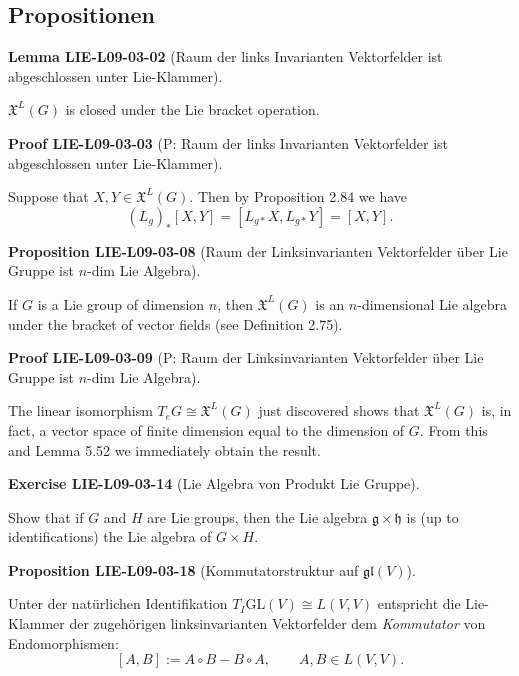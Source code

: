 \documentclass[10pt, letterpaper]{article}
\newcommand{\CustomHeading}[3]{%
  \par\medskip\noindent%
  \textbf{#1 #2} \textnormal{(#3)}.\enskip%
}
\newenvironment{PROP}[2]{\CustomHeading{Proposition}{#1}{#2}}{}
\newenvironment{LEM}[2]{\CustomHeading{Lemma}{#1}{#2}}{}
\newenvironment{EXE}[2]{\CustomHeading{Exercise}{#1}{#2}}{}
\newenvironment{PROOF}[2]{\CustomHeading{Proof}{#1}{#2}}{}
\begin{document}
\subsection{Propositionen}

\begin{LEM}{LIE-L09-03-02}{Raum der links Invarianten Vektorfelder ist abgeschlossen unter Lie-Klammer}
$\mathfrak{X}^{L}(G)$ is closed under the Lie bracket operation.
\end{LEM}

\begin{PROOF}{LIE-L09-03-03}{P: Raum der links Invarianten Vektorfelder ist abgeschlossen unter Lie-Klammer}
Suppose that $X, Y \in \mathfrak{X}^{L}(G)$. Then by Proposition 2.84 we have
$$
\left(L_{g}\right)_{*}[X, Y]=\left[L_{g *} X, L_{g *} Y\right]=[X, Y] .
$$
\end{PROOF}

\begin{PROP}{LIE-L09-03-08}{Raum der Linksinvarianten Vektorfelder über Lie Gruppe ist $n$-dim Lie Algebra}
If $G$ is a Lie group of dimension $n$, then $\mathfrak{X}^{L}(G)$ is an $n$-dimensional Lie algebra under the bracket of vector fields (see Definition 2.75).
\end{PROP}

\begin{PROOF}{LIE-L09-03-09}{P: Raum der Linksinvarianten Vektorfelder über Lie Gruppe ist $n$-dim Lie Algebra}
The linear isomorphism $T_{e} G \cong \mathfrak{X}^{L}(G)$ just discovered shows that $\mathfrak{X}^{L}(G)$ is, in fact, a vector space of finite dimension equal to the dimension of $G$. From this and Lemma 5.52 we immediately obtain the result.
\end{PROOF}

\begin{EXE}{LIE-L09-03-14}{Lie Algebra von Produkt Lie Gruppe}
Show that if $G$ and $H$ are Lie groups, then the Lie algebra $\mathfrak{g} \times \mathfrak{h}$ is (up to identifications) the Lie algebra of $G \times H$.
\end{EXE}

\begin{PROP}{LIE-L09-03-18}{Kommutatorstruktur auf $\mathfrak{gl}(V)$}
Unter der natürlichen Identifikation $T_I\mathrm{GL}(V)\cong L(V,V)$
entspricht die Lie-Klammer der zugehörigen linksinvarianten
Vektorfelder dem \emph{Kommutator} von Endomorphismen:
\[
[A,B]:=A\circ B - B\circ A,
\qquad
A,B\in L(V,V).
\]
\end{PROP}
\end{document}
